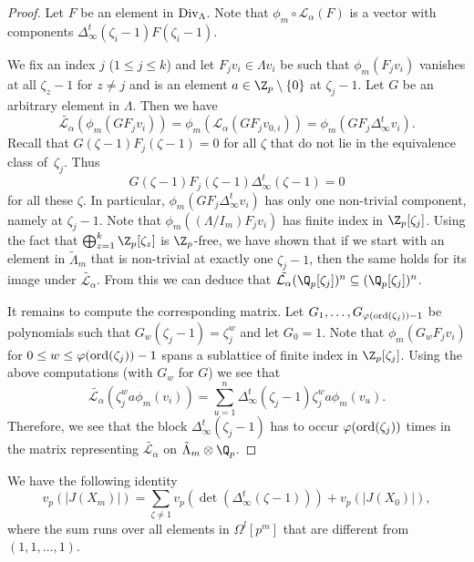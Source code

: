 \begin{proof}
	Let $F$ be an element in $\textup{Div}_\Lambda$. 
	Note that $\phi_m\circ \mathcal{L}_\alpha(F)$ is a vector with components $\Delta^t_\infty(\zeta_i-1)F(\zeta_i-1)$. 
	
	We fix an index $j$ ($1\le j\le k$) and let $F_jv_i\in \Lambda v_i$ be such that $\phi_m(F_jv_i)$ vanishes at all $\zeta_z-1$ for $z\neq j$ and is an element $a\in \Z_p\setminus\{0\}$ at $\zeta_j-1$. Let $G$ be an arbitrary element in $\Lambda$. Then we have
	\[\tilde{\mathcal{L}_\alpha}(\phi_m(GF_jv_i))=\phi_m(\mathcal{L}_\alpha (GF_jv_{0, i}))=\phi_m(GF_j \Delta^t_\infty v_i).\] 
	Recall that $G(\zeta-1)F_j(\zeta-1)=0$ for all $\zeta$ that do not lie in the equivalence class of~$\zeta_j$. Thus
	\[G(\zeta-1)F_j(\zeta-1)\Delta^t_\infty(\zeta-1)=0\]
	for all these $\zeta$. In particular, $\phi_m(GF_j\Delta^t_\infty v_i)$ has only one non-trivial component, namely at $\zeta_j-1$. Note that $\phi_m((\Lambda/I_m) F_jv_i)$ has finite index in $\Z_p[\zeta_j]$. 
	Using the fact that $\bigoplus_{z=1}^k\Z_p[\zeta_z]$ is $\Z_p$-free, we have shown that if we start with an element in $\tilde{\Lambda}_m$ that is non-trivial at exactly one $\zeta_j-1$, then the same holds for its image under $\tilde{\mathcal{L}_\alpha}$.
	From this we can deduce that $\tilde{\mathcal{L}_\alpha}(\Q_p[\zeta_j])^n\subseteq (\Q_p[\zeta_j])^n$.
	
	It remains to compute the corresponding matrix. Let $G_1,\ldots ,G_{\varphi(\textup{ord}(\zeta_j))-1}$ be polynomials such that $G_w(\zeta_j-1)=\zeta_j^w$ and let $G_0=1$. Note that $\phi_m(G_wF_jv_i)$ for $0\le w\le \varphi(\textup{ord}(\zeta_j))-1$ spans a sublattice of finite index in $\Z_p[\zeta_j]$. Using the above computations (with $G_w$ for $G$) we see that
	\[\tilde{\mathcal{L}_\alpha}(\zeta_j^wa\phi_m(v_{i}))=\sum_{u=1}^n\Delta^t_\infty(\zeta_j-1)\zeta_j^wa\phi_m(v_{u}).\] 
	Therefore, we see that the block $\Delta^t_\infty(\zeta_j-1)$ has to occur $\varphi(\textup{ord}(\zeta_j))$ times in the matrix representing $\tilde{\mathcal{L}_\alpha}$ on $\tilde{\Lambda}_m\otimes \Q_p$. 
\end{proof}
\begin{lemma} We have the following identity 
	\[v_p(\vert J(X_m)\vert)=\sum_{\zeta\neq 1}v_p(\det(\Delta^t_\infty(\zeta- 1)))+v_p(|J(X_0)|), \]
	where the sum runs over all elements in $\Omega^l[p^m]$ that are different from $(1,1,\dots,1)$.
\end{lemma}

